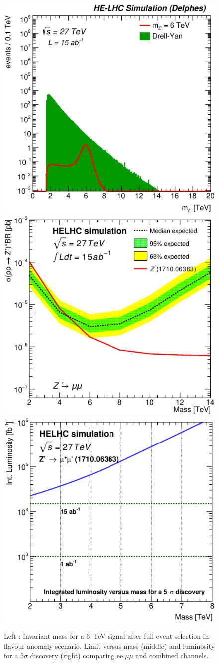 \documentclass{cernrep}
\begin{document}
\begin{figure}
  \centering
  \includegraphics[width=0.3\columnwidth]{Fig/27tev/mzp_sel0_nostack_log.eps}
  \includegraphics[width=0.3\columnwidth]{Fig/27tev/lim_Zprime_mumu_ano_helhc_v01.eps}
  \includegraphics[width=0.3\columnwidth]{Fig/27tev/DiscoveryPotential_mumu_rootStyle.eps}
  \caption{Left : Invariant mass for a 6~TeV signal after full event selection in flavour anomaly scenario. Limit versus mass (middle) and luminosity for a $5\sigma$ discovery (right) comparing ee,$\mu\mu$ and combined channels. }
  \label{figure:leptonicresonances27:resultsmumu_flav}
\end{figure}
\end{document}
